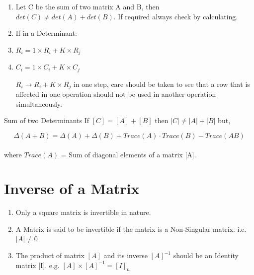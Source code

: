 \begin{enumerate}
    $$  \begin{vmatrix}
        x_1 + y_1 & x_2 + y_2 \\
        x_3 + y_3 & x_4 + y_4
        \end{vmatrix} =
        \begin{vmatrix}
        x_1 & x_2 + y_2 \\
        x_3 & x_4 + y_4
        \end{vmatrix} +
        \begin{vmatrix}
        y_1 & x_2 + y_2 \\
        y_3 & x_4 + y_4
        \end{vmatrix}
    $$

    \item Let C be the sum of two matrix A and B, then $det(C) \neq det(A) + det(B)$. If required always check by calculating.

    \item If in a Determinant:
    \item[i.] $R_i = 1 \times R_i + K \times R_j$
    \item[ii.] $C_i = 1 \times C_i + K \times C_j$

    $R_i \xrightarrow{} R_i + K \times R_j$ in one step, care should be taken to see that a row that is affected in one operation should not be used in another operation simultaneously.
\end{enumerate}

\begin{impbox}{Sum of two Determinants}
    If $[C] = [A] + [B]$ then $|C| \neq |A| + |B|$ but,

    $$ \Delta(A + B) = \Delta(A) + \Delta(B) + Trace(A) \cdot Trace(B) - Trace(AB)
    $$
    \\
    where $Trace(A)$ = Sum of diagonal elements of a matrix [A].
\end{impbox}

\section{Inverse of a Matrix}

\begin{enumerate}
    \item Only a square matrix is invertible in nature.

    \item A Matrix is said to be invertible if the matrix is a Non-Singular matrix. i.e. $|A| \neq 0$

    \item The product of matrix $[A]$ and its inverse $[A]^{-1}$ should be an Identity matrix [I]. e.g. $[A] \times [A]^{-1} = [I]_n$
\end{enumerate}

